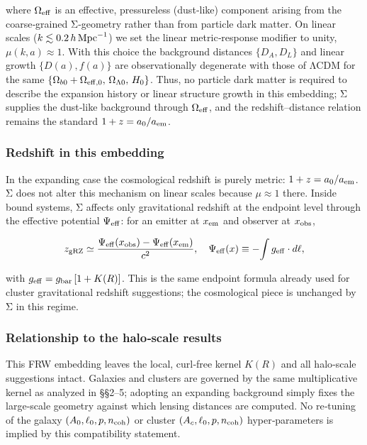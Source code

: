\documentclass[11pt,a4paper]{article}
\begin{document}
where $\Omega_{\rm eff}$ is an effective, pressureless (dust‑like) component arising from the coarse‑grained Σ‑geometry rather than from particle dark matter. On linear scales ($k \lesssim 0.2\,h\,{\rm Mpc}^{-1}$) we set the linear metric‑response modifier to unity, $\mu(k,a) \approx 1$. With this choice the background distances $\{D_A, D_L\}$ and linear growth $\{D(a), f(a)\}$ are observationally degenerate with those of ΛCDM for the same $\{\Omega_{b0} + \Omega_{\rm eff,0},\, \Omega_{\Lambda 0},\, H_0\}$. Thus, no particle dark matter is required to describe the expansion history or linear structure growth in this embedding; Σ supplies the dust‑like background through $\Omega_{\rm eff}$, and the redshift–distance relation remains the standard $1+z = a_0/a_{\rm em}$.


\subsubsection{Redshift in this embedding}


In the expanding case the cosmological redshift is purely metric: $1+z = a_0/a_{\rm em}$. Σ does not alter this mechanism on linear scales because $\mu \approx 1$ there. Inside bound systems, Σ affects only gravitational redshift at the endpoint level through the effective potential $\Psi_{\rm eff}$: for an emitter at $x_{\rm em}$ and observer at $x_{\rm obs}$,


\begin{equation}
z_{\rm gRZ} \simeq \frac{\Psi_{\rm eff}(x_{\rm obs}) - \Psi_{\rm eff}(x_{\rm em})}{c^2}, \quad \Psi_{\rm eff}(x) \equiv -\!\int g_{\rm eff}\cdot d\ell,
\end{equation}


with $g_{\rm eff} = g_{\rm bar}\,[1 + K(R)]$. This is the same endpoint formula already used for cluster gravitational redshift suggestions; the cosmological piece is unchanged by Σ in this regime.


\subsubsection{Relationship to the halo‑scale results}


This FRW embedding leaves the local, curl‑free kernel $K(R)$ and all halo‑scale suggestions intact. Galaxies and clusters are governed by the same multiplicative kernel as analyzed in §§2–5; adopting an expanding background simply fixes the large‑scale geometry against which lensing distances are computed. No re‑tuning of the galaxy $(A_0, \ell_0, p, n_{\rm coh})$ or cluster $(A_c, \ell_0, p, n_{\rm coh})$ hyper‑parameters is implied by this compatibility statement.
\end{document}
